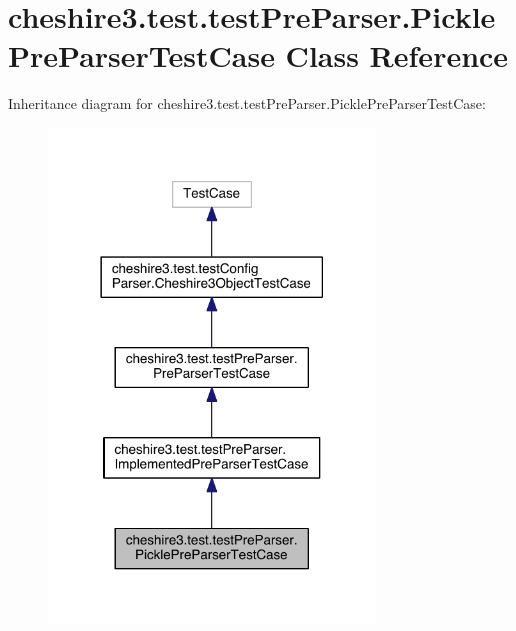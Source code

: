 \hypertarget{classcheshire3_1_1test_1_1test_pre_parser_1_1_pickle_pre_parser_test_case}{\section{cheshire3.\-test.\-test\-Pre\-Parser.\-Pickle\-Pre\-Parser\-Test\-Case Class Reference}
\label{classcheshire3_1_1test_1_1test_pre_parser_1_1_pickle_pre_parser_test_case}
}


Inheritance diagram for cheshire3.\-test.\-test\-Pre\-Parser.\-Pickle\-Pre\-Parser\-Test\-Case\-:
\nopagebreak
\begin{figure}[H]
\begin{center}
\leavevmode
\includegraphics[width=246pt]{classcheshire3_1_1test_1_1test_pre_parser_1_1_pickle_pre_parser_test_case__inherit__graph}
\end{center}
\end{figure}



